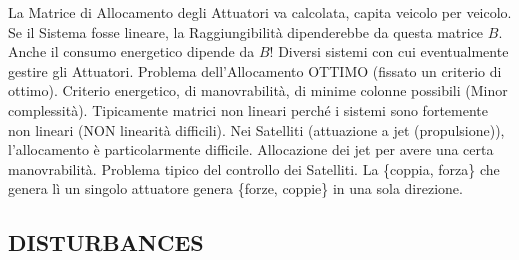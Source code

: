 La Matrice di Allocamento degli Attuatori va calcolata, capita veicolo per veicolo. Se il Sistema fosse lineare, la Raggiungibilità dipenderebbe da questa matrice $B$. Anche il consumo energetico dipende da $B$! Diversi sistemi con cui eventualmente gestire gli Attuatori. Problema dell'Allocamento OTTIMO (fissato un criterio di ottimo). Criterio energetico, di manovrabilità, di minime colonne possibili (Minor complessità). Tipicamente matrici non lineari perché i sistemi sono fortemente non lineari (NON linearità difficili). Nei Satelliti (attuazione a jet (propulsione)), l'allocamento è particolarmente difficile. Allocazione dei jet per avere una certa manovrabilità. Problema tipico del controllo dei Satelliti. La \{coppia, forza\} che genera lì un singolo attuatore genera \{forze, coppie\} in una sola direzione.

\subsection{DISTURBANCES}

